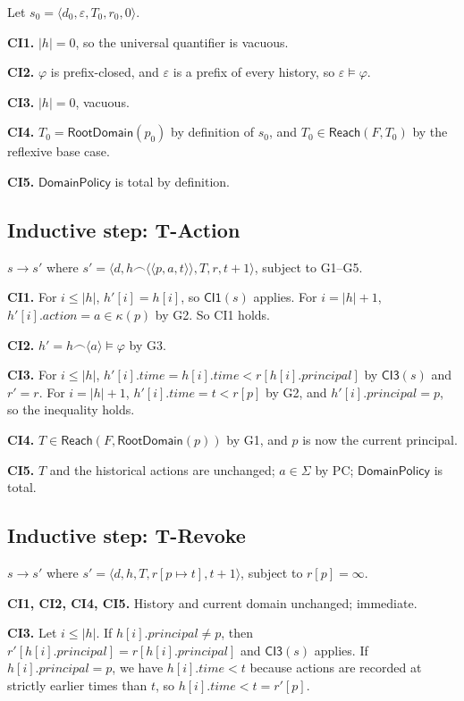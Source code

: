 \documentclass[11pt,a4paper]{article}
\theoremstyle{plain}
\theoremstyle{definition}
\theoremstyle{remark}
\begin{document}
Let $s_0 = \langle d_0, \varepsilon, T_0, r_0, 0 \rangle$.

\textbf{CI1.} $|h| = 0$, so the universal quantifier is vacuous.

\textbf{CI2.} $\varphi$ is prefix-closed, and $\varepsilon$ is a prefix of
every history, so $\varepsilon \models \varphi$.

\textbf{CI3.} $|h| = 0$, vacuous.

\textbf{CI4.} $T_0 = \mathsf{RootDomain}(p_0)$ by definition of $s_0$, and
$T_0 \in \mathsf{Reach}(F, T_0)$ by the reflexive base case.

\textbf{CI5.} $\mathsf{DomainPolicy}$ is total by definition.

\subsection{Inductive step: T-Action}

$s \to s'$ where $s' = \langle d, h \frown \langle \langle p, a, t \rangle
\rangle, T, r, t + 1 \rangle$, subject to G1--G5.

\textbf{CI1.} For $i \le |h|$, $h'[i] = h[i]$, so $\mathsf{CI1}(s)$ applies.
For $i = |h| + 1$, $h'[i].\mathit{action} = a \in \kappa(p)$ by G2. So CI1
holds.

\textbf{CI2.} $h' = h \frown \langle a \rangle \models \varphi$ by G3.

\textbf{CI3.} For $i \le |h|$, $h'[i].\mathit{time} = h[i].\mathit{time} <
r[h[i].\mathit{principal}]$ by $\mathsf{CI3}(s)$ and $r' = r$. For
$i = |h| + 1$, $h'[i].\mathit{time} = t < r[p]$ by G2, and
$h'[i].\mathit{principal} = p$, so the inequality holds.

\textbf{CI4.} $T \in \mathsf{Reach}(F, \mathsf{RootDomain}(p))$ by G1, and
$p$ is now the current principal.

\textbf{CI5.} $T$ and the historical actions are unchanged; $a \in \Sigma$ by
PC; $\mathsf{DomainPolicy}$ is total.

\subsection{Inductive step: T-Revoke}

$s \to s'$ where $s' = \langle d, h, T, r[p \mapsto t], t + 1 \rangle$,
subject to $r[p] = \infty$.

\textbf{CI1, CI2, CI4, CI5.} History and current domain unchanged; immediate.

\textbf{CI3.} Let $i \le |h|$. If $h[i].\mathit{principal} \neq p$, then
$r'[h[i].\mathit{principal}] = r[h[i].\mathit{principal}]$ and $\mathsf{CI3}(s)$
applies. If $h[i].\mathit{principal} = p$, we have $h[i].\mathit{time} < t$
because actions are recorded at strictly earlier times than $t$, so
$h[i].\mathit{time} < t = r'[p]$.
\end{document}
